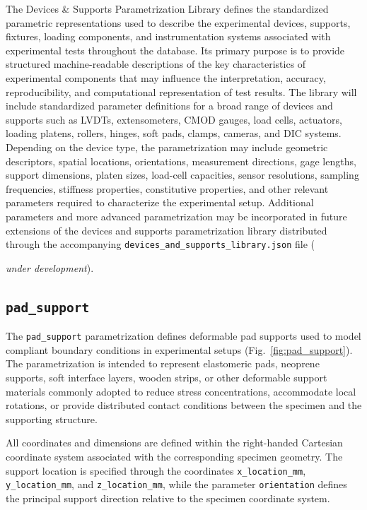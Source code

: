\documentclass[11pt]{book}
\begin{document}
The Devices \& Supports Parametrization Library defines the standardized parametric representations used to describe the experimental devices, supports, fixtures, loading components, and instrumentation systems associated with experimental tests throughout the database. Its primary purpose is to provide structured machine-readable descriptions of the key characteristics of experimental components that may influence the interpretation, accuracy, reproducibility, and computational representation of test results. The library will include standardized parameter definitions for a broad range of devices and supports such as LVDTs, extensometers, CMOD gauges, load cells, actuators, loading platens, rollers, hinges, soft pads, clamps, cameras, and DIC systems. Depending on the device type, the parametrization may include geometric descriptors, spatial locations, orientations, measurement directions, gage lengths, support dimensions, platen sizes, load-cell capacities, sensor resolutions, sampling frequencies, stiffness properties, constitutive properties, and other relevant parameters required to characterize the experimental setup. Additional parameters and more advanced parametrization may be incorporated in future extensions of the devices and supports parametrization library distributed through the accompanying \texttt{devices\_and\_supports\_library.json} file ({\emph{under development}).

\subsection{\texttt{pad\_support}}

The \texttt{pad\_support} parametrization defines deformable pad supports used to model compliant boundary conditions in experimental setups (Fig.~\ref{fig:pad_support}). The parametrization is intended to represent elastomeric pads, neoprene supports, soft interface layers, wooden strips, or other deformable support materials commonly adopted to reduce stress concentrations, accommodate local rotations, or provide distributed contact conditions between the specimen and the supporting structure.

All coordinates and dimensions are defined within the right-handed Cartesian coordinate system associated with the corresponding specimen geometry. The support location is specified through the coordinates \texttt{x\_location\_mm}, \texttt{y\_location\_mm}, and \texttt{z\_location\_mm}, while the parameter \texttt{orientation} defines the principal support direction relative to the specimen coordinate system.

}
\end{document}
